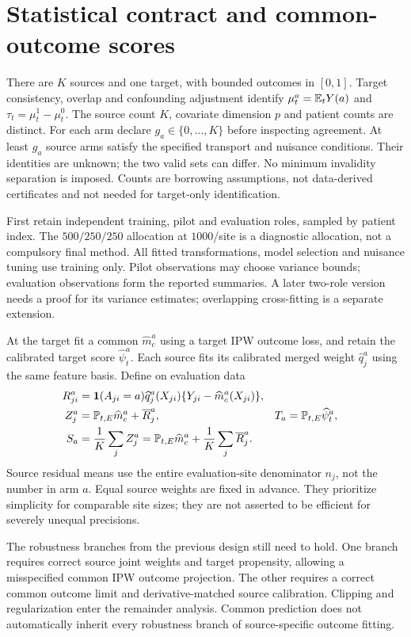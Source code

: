 \section{Statistical contract and common-outcome scores}

There are $K$ sources and one target, with bounded outcomes in $[0,1]$.
Target consistency, overlap and confounding adjustment identify
$\mu_t^a=\mathbb E_tY(a)$ and $\tau_t=\mu_t^1-\mu_t^0$.
The source count $K$, covariate dimension $p$ and patient counts are distinct.
For each arm declare $g_a\in\{0,\ldots,K\}$ before inspecting agreement.
At least $g_a$ source arms satisfy the specified transport and nuisance
conditions. Their identities are unknown; the two valid sets can differ.
No minimum invalidity separation is imposed. Counts are borrowing assumptions,
not data-derived certificates and not needed for target-only identification.

First retain independent training, pilot and evaluation roles, sampled by
patient index. The $500/250/250$ allocation at $1000$/site is a diagnostic
allocation, not a compulsory final method. All fitted transformations,
model selection and nuisance tuning use training only. Pilot observations
may choose variance bounds; evaluation observations form the reported
summaries. A later two-role version needs a proof for its variance estimates;
overlapping cross-fitting is a separate extension.

At the target fit a common $\widehat m_c^a$ using a target IPW outcome loss,
and retain the calibrated target score $\widehat\psi_t^a$. Each source fits
its calibrated merged weight $\widehat q_j^a$ using the same feature basis.
Define on evaluation data
\begin{align}
 R_{ji}^a&=\mathbf 1(A_{ji}=a)\widehat q_j^a(X_{ji})
                     \{Y_{ji}-\widehat m_c^a(X_{ji})\},\\
 Z_j^a&=\mathbb P_{t,E}\widehat m_c^a+\overline R_j^a,
 &T_a&=\mathbb P_{t,E}\widehat\psi_t^a,\\
 S_a&=\frac1K\sum_jZ_j^a
     =\mathbb P_{t,E}\widehat m_c^a+\frac1K\sum_j\overline R_j^a.
 \label{eq:v2-scores}
\end{align}
Source residual means use the entire evaluation-site denominator $n_j$,
not the number in arm $a$. Equal source weights are fixed in advance.
They prioritize simplicity for comparable site sizes; they are not asserted
to be efficient for severely unequal precisions.

The robustness branches from the previous design still need to hold.
One branch requires correct source joint weights and target propensity,
allowing a misspecified common IPW outcome projection. The other requires
a correct common outcome limit and derivative-matched source calibration.
Clipping and regularization enter the remainder analysis. Common prediction
does not automatically inherit every robustness branch of source-specific
outcome fitting.

